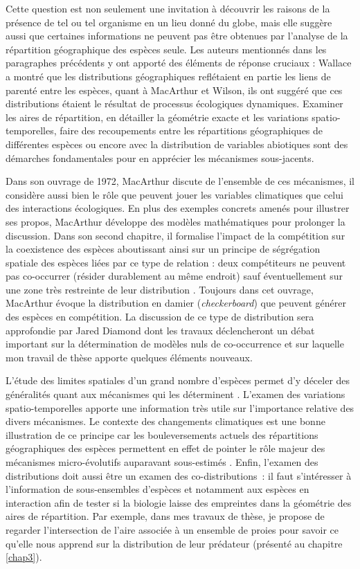 Cette question est non seulement une invitation à découvrir les raisons
de la présence de tel ou tel organisme en un lieu donné du globe, mais
elle suggère aussi que certaines informations ne peuvent pas être
obtenues par l'analyse de la répartition géographique des espèces seule.
Les auteurs mentionnés dans les paragraphes précédents y ont apporté des
éléments de réponse cruciaux : Wallace a montré que les distributions
géographiques reflétaient en partie les liens de parenté entre les
espèces, quant à MacArthur et Wilson, ils ont suggéré que ces
distributions étaient le résultat de processus écologiques dynamiques.
Examiner les aires de répartition, en détailler la géométrie exacte et
les variations spatio-temporelles, faire des recoupements entre les
répartitions géographiques de différentes espèces ou encore avec la
distribution de variables abiotiques sont des démarches fondamentales
pour en apprécier les mécanismes sous-jacents.

Dans son ouvrage de 1972, MacArthur discute de l'ensemble de ces
mécanismes, il considère aussi bien le rôle que peuvent jouer les
variables climatiques que celui des interactions écologiques. En plus
des exemples concrets amenés pour illustrer ses propos, MacArthur
développe des modèles mathématiques pour prolonger la discussion. Dans
son second chapitre, il formalise l'impact de la compétition sur la
coexistence des espèces aboutissant ainsi sur un principe de ségrégation
spatiale des espèces liées par ce type de relation : deux compétiteurs
ne peuvent pas co-occurrer (résider durablement au même endroit) sauf
éventuellement sur une zone très restreinte de leur distribution
\citep{macarthur1972geographical}. Toujours dans cet ouvrage, MacArthur
évoque la distribution en damier (\emph{checkerboard}) que peuvent
générer des espèces en compétition. La discussion de ce type de
distribution sera approfondie par Jared Diamond \citep{Diamond1975} dont
les travaux déclencheront un débat important sur la détermination de
modèles nuls de co-occurrence \citep{Connor1979} et sur laquelle mon
travail de thèse apporte quelques éléments nouveaux.

L'étude des limites spatiales d'un grand nombre d'espèces permet d'y
déceler des généralités quant aux mécanismes qui les déterminent
\citep{macarthur1972geographical}. L'examen des variations
spatio-temporelles apporte une information très utile sur l'importance
relative des divers mécanismes. Le contexte des changements climatiques
est une bonne illustration de ce principe car les bouleversements
actuels des répartitions géographiques des espèces permettent en effet
de pointer le rôle majeur des mécanismes micro-évolutifs auparavant
sous-estimés \citep{Lavergne2010}. Enfin, l'examen des distributions
doit aussi être un examen des co-distributions~: il faut s'intéresser à
l'information de sous-ensembles d'espèces et notamment aux espèces en
interaction afin de tester si la biologie laisse des empreintes dans la
géométrie des aires de répartition. Par exemple, dans mes travaux de
thèse, je propose de regarder l'intersection de l'aire associée à un
ensemble de proies pour savoir ce qu'elle nous apprend sur la
distribution de leur prédateur (présenté au chapitre \ref{chap3}).

